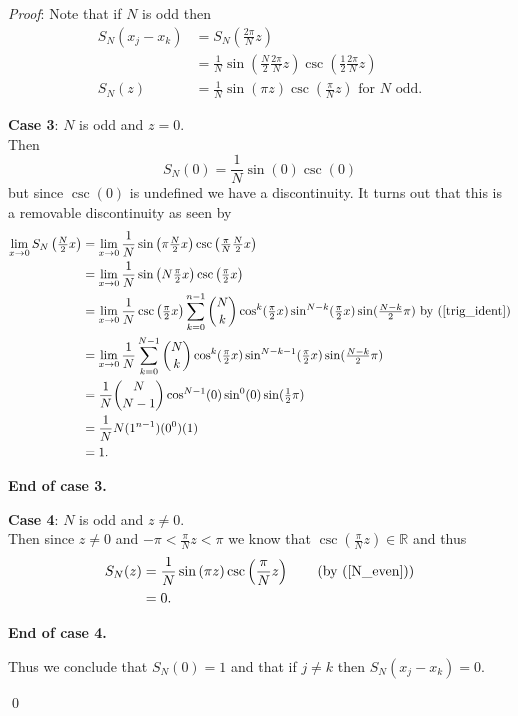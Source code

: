 \documentclass[12pt]{article}
\renewenvironment{proof}{\hspace{-4 ex} \emph{Proof}:}{\qed}
\newcommand{\RR}{\mathbb{R}}
\begin{document}
\begin{proof}
	Note that if $N$ is odd then
	\begin{align}
	S_N(x_j - x_k) &= S_N\left( \frac{2\pi}{N}z \right) \nonumber \\
	&= \frac{1}{N} \sin \left(\frac{N}{2}\frac{2\pi}{N}z \right) \csc \left( \frac{1}{2}\frac{2\pi}{N}z \right) \nonumber \\
	S_N(z) &= \frac{1}{N} \sin \left(\pi z \right) \csc \left( \frac{\pi}{N}z \right) \label{N_odd} \text{ for }N \text{ odd.}
	\end{align}
	\bigbreak
	
	\textbf{Case 3}: $N$ is odd and $z=0$. \\
	Then
	$$
	S_N(0) = \frac{1}{N} \sin \left(0 \right) \csc \left( 0 \right)
	$$
	but since $\csc(0)$ is undefined we have a discontinuity. It turns out that this is a removable discontinuity as seen by
	\begin{align*}
		\lim_{x \to 0}S_N \left( \tfrac{N}{2}x \right) &= \lim_{x \to 0} \frac{1}{N} \sin \left(\pi \tfrac{N}{2}x \right) \csc \left( \tfrac{\pi}{N}\tfrac{N}{2}x \right) \\
		&= \lim_{x \to 0} \frac{1}{N} \sin \left(N \tfrac{\pi}{2}x \right) \csc \left( \tfrac{\pi}{2}x \right) \\
		&= \lim_{x \to 0} \frac{1}{N}  \csc \left( \tfrac{\pi}{2}x \right) \sum_{k=0}^{n-1} {N \choose k} \cos^k(\tfrac{\pi}{2}x) \sin^{N-k}(\tfrac{\pi}{2}x) \sin(\tfrac{N-k}{2}\pi) \text{ by }(\ref{trig_ident})\\
		&= \lim_{x \to 0} \frac{1}{N} \sum_{k=0}^{N-1} {N \choose k} \cos^{k}(\tfrac{\pi}{2}x) \sin^{N-k-1}(\tfrac{\pi}{2}x) \sin(\tfrac{N-k}{2}\pi) \\
		&= \frac{1}{N} {N \choose N-1} \cos^{N-1}(0)\sin^{0}(0) \sin(\tfrac{1}{2}\pi) \\
		&= \frac{1}{N} N (1^{n-1})(0^0)(1) \\
		&= 1 \text{.}
	\end{align*}
	
	\textbf{End of case 3.}
	\bigbreak
	
	\textbf{Case 4}: $N$ is odd and $z\neq 0$. \\
	Then since $z \neq 0$ and $-\pi < \frac{\pi}{N}z < \pi$ we know that $\csc(\tfrac{\pi}{N}z) \in \RR$ and thus
	\begin{align*}
		S_N(z) &= \frac{1}{N} \sin \left(\pi z \right) \csc \left( \frac{\pi}{N}z \right) \tag{\text{by (\ref{N_even})}}\\
		&= 0 \text{.}
	\end{align*}	
	
	\textbf{End of case 4.}
	\bigbreak
	
	Thus we conclude that $S_N(0)=1$ and that if $j \neq k$ then $S_N(x_j - x_k) = 0$.
	
\end{proof}
\bigbreak
\end{document}
